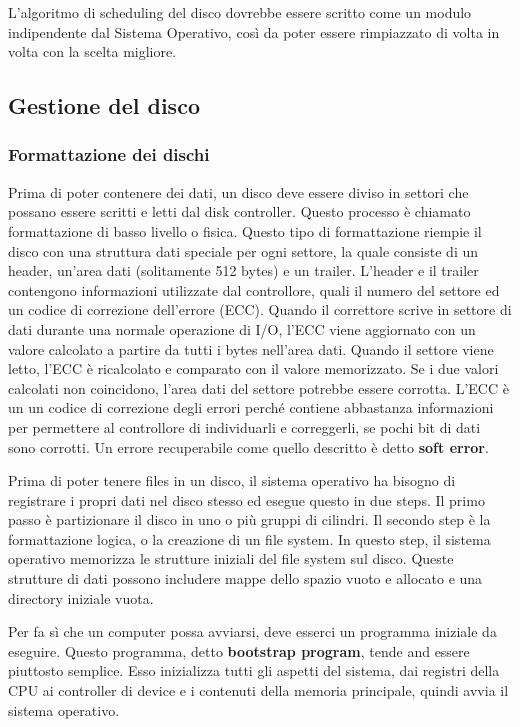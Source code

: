 \documentclass[a4paper]{article}
\begin{document}
L'algoritmo di scheduling del disco dovrebbe essere scritto come un modulo indipendente dal Sistema Operativo, così da poter essere rimpiazzato di volta in volta con la scelta migliore.

\subsection{Gestione del disco}

\subsubsection{Formattazione dei dischi}
Prima di poter contenere dei dati, un disco deve essere diviso in settori che possano essere scritti e letti dal disk controller. Questo processo è chiamato formattazione di basso livello o fisica. Questo tipo di formattazione riempie il disco con una struttura dati speciale per ogni settore, la quale consiste di un header, un'area dati (solitamente 512 bytes) e un trailer. L'header e il trailer contengono informazioni utilizzate dal controllore, quali il numero del settore ed un codice di correzione dell'errore (ECC). Quando il correttore scrive in settore di dati durante una normale operazione di I/O, l'ECC viene aggiornato con un valore calcolato a partire da tutti i bytes nell'area dati. Quando il settore viene letto, l'ECC è ricalcolato e comparato con il valore memorizzato. Se i due valori calcolati non coincidono, l'area dati del settore potrebbe essere corrotta. L'ECC è un un codice di correzione degli errori perché contiene abbastanza informazioni per permettere al controllore di individuarli e correggerli, se pochi bit di dati sono corrotti. Un errore recuperabile come quello descritto è detto \textbf{soft error}.

Prima di poter tenere files in un disco, il sistema operativo ha bisogno di registrare i propri dati nel disco stesso ed esegue questo in due steps. Il primo passo è partizionare il disco in uno o più gruppi di cilindri. Il secondo step è la formattazione logica, o la creazione di un file system. In questo step, il sistema operativo memorizza le strutture iniziali del file system sul disco. Queste strutture di dati possono includere mappe dello spazio vuoto e allocato e una directory iniziale vuota.

Per fa sì che un computer possa avviarsi, deve esserci un programma iniziale da eseguire. Questo programma, detto \textbf{bootstrap program}, tende and essere piuttosto semplice. Esso inizializza tutti gli aspetti del sistema, dai registri della CPU ai controller di device e i contenuti della memoria principale, quindi avvia il sistema operativo.
\end{document}
